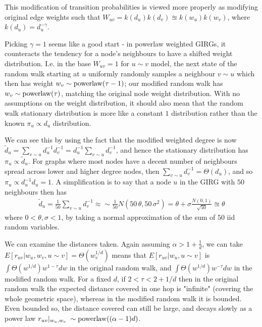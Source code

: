 This modification of transition probabilities is viewed more properly as modifying original edge weights such that $W_{uv} = k(d_u) k(d_v) \approxeq k(w_u) k(w_v)$, where $k(d_u) = d_u^{-\gamma}$.

Picking $\gamma=1$ seems like a good start - in powerlaw weighted GIRGs, it counteracts the tendency for a node's neighbours to have a shifted weight distribution. I.e. in the base $W_{uv} = 1$ for $u \sim v$  model, the next state of the random walk starting at $u$ uniformly randomly samples a neighbour $v \sim u$ which then has weight $w_v \sim \operatorname{powerlaw}(\tau - 1)$; our modified random walk has $w_v \sim \operatorname{powerlaw}(\tau)$, matching the original node weight distribution. With no assumptions on the weight distribution, it should also mean that the random walk stationary distribution is more like a constant $1$ distribution rather than the known $\pi_u \propto d_u$ distribution.

We can see this by using the fact that the modified weighted degree is now $\tilde{d}_u = \sum_{v \sim u} d_u^{-1} d_v^{-1} = d_u^{-1} \sum_{v \sim u} d_v^{-1}$, and hence the stationary distribution has $\pi_u \propto \tilde{d}_u$. For graphs where most nodes have a decent number of neighbours spread across lower and higher degree nodes, then $\sum_{v \sim u} d_v^{-1} = \Theta(d_u)$, and so $\pi_u \propto d_u^{-1} d_u = 1$. A simplification is to say that a node $u$ in the GIRG with $50$ neighbours then has 
\begin{align}
  \tilde{d}_u = \frac{1}{50} \sum_{v \sim u} d_v^{-1} \approx \sim  \frac{1}{50}
N(50\, \theta, 50 \, \sigma^2)
= \theta + \sigma \frac{N(0, 1)}{\sqrt{50}} \approxeq \theta
\end{align}
where $0 < \theta, \sigma < 1$, by taking a normal approximation of the sum of $50$ iid random variables.

We can examine the distances taken. Again assuming $\alpha > 1 + \frac{1}{d}$, we can take $E[r_{uv} | w_u, w_v, u \sim v] = \Theta(w_v^{1/d})$ means that $E[r_{uv} | w_u, u \sim v]$ is $\int \Theta(w^{1/d}) w^{1-\tau} dw$ in the original random walk, and $\int \Theta(w^{1/d}) w^{-\tau} dw$ in the modified random walk. For a fixed $d$, if $2 < \tau < 2 + 1/d$ then in the original random walk the expected distance covered in one hop is "infinite" (covering the whole geometric space), whereas in the modified random walk it is bounded. Even bounded so, the distance covered can still be large, and decays slowly as a power law $r_{uv} |_{w_u, w_v} \; \sim \operatorname{powerlaw}( (\alpha - 1)d)$.


